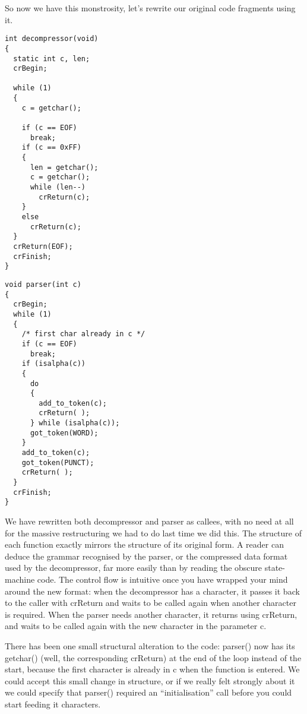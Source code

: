 \documentclass[12pt]{article}
\begin{document}
\begin{CJK}{UTF8}{bsmi}
So now we have this monstrosity, let's rewrite our original code fragments using it.

\newpage
\begin{multicols}{2}
\begin{lstlisting}[caption=decompressor, basicstyle=\footnotesize, breaklines=true]
int decompressor(void) 
{
  static int c, len;
  crBegin;

  while (1) 
  {
    c = getchar();

    if (c == EOF)
      break;
    if (c == 0xFF) 
    {
      len = getchar();
      c = getchar();
      while (len--)
        crReturn(c);
    } 
    else
      crReturn(c);
  }
  crReturn(EOF);
  crFinish;
}
\end{lstlisting}


\begin{lstlisting}[caption=parser, basicstyle=\footnotesize, breaklines=true]
void parser(int c) 
{
  crBegin;
  while (1) 
  {
    /* first char already in c */
    if (c == EOF)
      break;
    if (isalpha(c)) 
    {
      do 
      {
        add_to_token(c);
        crReturn( );
      } while (isalpha(c));
      got_token(WORD);
    }
    add_to_token(c);
    got_token(PUNCT);
    crReturn( );
  }
  crFinish;
}
\end{lstlisting}
\end{multicols}

We have rewritten both decompressor and parser as callees, with no need at all for the massive restructuring we had to do last time we did this. The structure of each function exactly mirrors the structure of its original form. A reader can deduce the grammar recognised by the parser, or the compressed data format used by the decompressor, far more easily than by reading the obscure state-machine code. The control flow is intuitive once you have wrapped your mind around the new format: when the decompressor has a character, it passes it back to the caller with crReturn and waits to be called again when another character is required. When the parser needs another character, it returns using crReturn, and waits to be called again with the new character in the parameter c.

There has been one small structural alteration to the code: parser() now has its getchar() (well, the corresponding crReturn) at the end of the loop instead of the start, because the first character is already in c when the function is entered. We could accept this small change in structure, or if we really felt strongly about it we could specify that parser() required an ``initialisation'' call before you could start feeding it characters.


\end{CJK}
\end{document}

